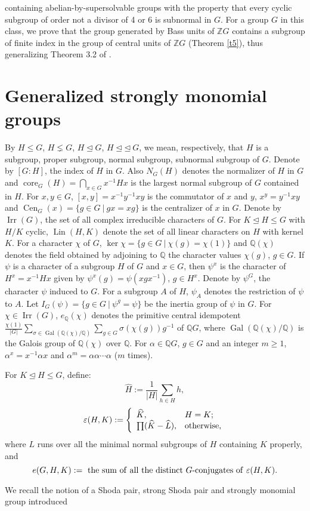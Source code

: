 \documentclass[12pt,a4paper]{article}
\begin{document}
containing abelian-by-supersolvable groups with the property that every cyclic subgroup of order not a divisor of 4 or 6 is subnormal in $G$. For a group $G$ in this class, we prove that the group generated by Bass units of $\mathbb{Z}G$ contains a subgroup of finite index in the group of central units of  $ \mathbb{Z}G$ (Theorem \ref{t5}), thus generalizing Theorem 3.2 of \cite{JOdRVG}. \section{Generalized strongly monomial groups} By $H\leq G$, $H \lneq G$, $H \unlhd G$, $H \unlhd$$\unlhd~G$, we mean, respectively, that $H$ is a subgroup, proper subgroup, normal subgroup, subnormal subgroup of $G$. Denote by \linebreak $[G:H]$, the index of $H$ in $G$. Also $N_{G}(H)$ denotes the normalizer of $H$ in $G$ and $\operatorname{core}_{G}(H)=\bigcap_{x \in G}x^{-1}Hx$ is the largest normal subgroup of $G$ contained in $H$. For $x,y\in G$, $[x,y]=x^{-1}y^{-1}xy$ is the commutator of $x$ and $y$, $x^{y}= y^{-1}xy$ and $\operatorname{Cen}_{G}(x)=\{g \in G~|~gx=xg\}$ is the centralizer of $x$ in $G$. Denote by $\operatorname{Irr}(G)$, the set of all complex irreducible characters of $G$. For $K\unlhd H\leq G$ with $H/K$ cyclic, $\operatorname{Lin}(H,K)$ denote the set of all linear characters on $H$ with kernel $K$. For a character $\chi$ of $G$, $\operatorname{ker}\chi =\{ g \in G~|~\chi(g)=\chi(1)\}$ and $\mathbb{Q}(\chi)$ denotes the field obtained by adjoining to $\mathbb{Q}$ the character values $\chi(g)$, $g\in G$. If $\psi$ is a character of a subgroup $H$ of $G$ and $x\in G$, then $\psi^{x}$ is the character of $H^{x}=x^{-1}Hx$ given by $\psi^{x}(g)=\psi(xgx^{-1})$, $g \in H^{x}$. Denote by $\psi^{G}$, the character $\psi$ induced to $G$. For a subgroup $A$ of $H$, $\psi_{A}$ denotes the restriction of $\psi$ to $A$. Let $I_{G}(\psi)=\{ g \in G~|~\psi^{g}=\psi\}$ be the inertia group of $\psi$ in $G$. For $\chi \in \operatorname{Irr}(G)$, $e_{\mathbb{Q}}(\chi)$ denotes the primitive central idempotent $\frac{\chi(1)}{|G|}\sum_{\sigma \in \operatorname{Gal}(\mathbb{Q}(\chi)/\mathbb{Q})} \sum_{g \in G}\sigma(\chi(g))g^{-1}$ of $\mathbb{Q}G$, where $\operatorname{Gal}(\mathbb{Q}(\chi)/\mathbb{Q})$ is the Galois group of $\mathbb{Q}(\chi)$ over $\mathbb{Q}$. For $\alpha \in \mathbb{Q}G$, $g \in G$ and an integer $m \geq 1$, $\alpha^{x}=x^{-1}\alpha x$ and $\alpha^{m}=\alpha\alpha \cdots \alpha$ ($m$ times).\par For $K\unlhd H\leq G$, define:$$\widehat{H}:=\frac{1}{|H|}\displaystyle\sum_{h \in H}h,$$ $$\varepsilon(H,K):=\left\{\begin{array}{ll}\widehat{K}, & \hbox{$H=K$;} \\\prod(\widehat{K}-\widehat{L}), & \hbox{otherwise,}\end{array}\right.$$ where $L$ runs over all the minimal normal subgroups of $H$ containing $K$ properly, and $$e(G,H,K):= {\rm~the~sum~of~all~the~distinct~}G{\rm {\tiny{\operatorname{-}}} conjugates~of~}\varepsilon(H,K).$$ \par We recall the notion of a Shoda pair,  strong Shoda pair and  strongly monomial group introduced 
\end{document}
